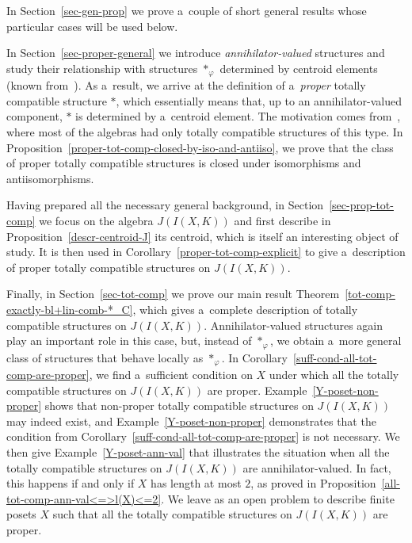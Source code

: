 \documentclass{jonasart}
\newcommand{\vf}{\varphi}
\begin{document}
	In Section~\ref{sec-gen-prop} we prove a~couple of short general results whose particular cases will be used below.

	In Section~\ref{sec-proper-general} we introduce \textit{annihilator-valued} structures and study their relationship with structures $*_\vf$ determined by centroid elements (known from~\cite{Khr2024}). As a~result, we arrive at the definition of a~\textit{proper} totally compatible structure $*$, which essentially means that, up to an annihilator-valued component, $*$ is determined by a~centroid element. The motivation comes from~\cite{Khr2024,Khr2024b}, where most of the algebras had only totally compatible structures of this type. In Proposition~\ref{proper-tot-comp-closed-by-iso-and-antiiso}, we prove that the class of proper totally compatible structures is closed under isomorphisms and antiisomorphisms.

	Having prepared all the necessary general background, in Section~\ref{sec-prop-tot-comp} we focus on the algebra $J(I(X,K))$ and first describe in Proposition~\ref{descr-centroid-J} its centroid, which is itself an interesting object of study. It is then used in Corollary~\ref{proper-tot-comp-explicit} to give a~description of proper totally compatible structures on $J(I(X,K))$.

	Finally, in Section~\ref{sec-tot-comp} we prove our main result Theorem~\ref{tot-comp-exactly-bl+lin-comb-*_C}, which gives a~complete description of totally compatible structures on $J(I(X,K))$. Annihilator-valued structures again play an important role in this case, but, instead of $*_\vf$, we obtain a~more general class of structures that behave locally as $*_\vf$. In Corollary~\ref{suff-cond-all-tot-comp-are-proper}, we find a~sufficient condition on $X$ under which all the totally compatible structures on $J(I(X,K))$ are proper. Example~\ref{Y-poset-non-proper} shows that non-proper totally compatible structures on $J(I(X,K))$ may indeed exist, and Example~\ref{Y-poset-non-proper} demonstrates that the condition from Corollary~\ref{suff-cond-all-tot-comp-are-proper} is not necessary. We then give Example~\ref{Y-poset-ann-val} that illustrates the situation when all the totally compatible structures on $J(I(X,K))$ are annihilator-valued. In fact, this happens if and only if $X$ has length at most $2$, as proved in Proposition~\ref{all-tot-comp-ann-val<=>l(X)<=2}. We leave as an open problem to describe finite posets $X$ such that all the totally compatible structures on $J(I(X,K))$ are proper.
\end{document}
